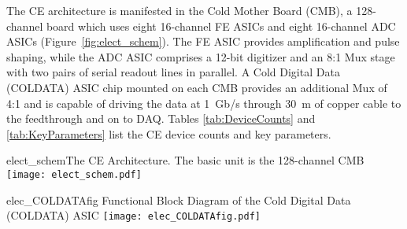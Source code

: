 The CE architecture is manifested in the Cold Mother Board (CMB),
a 128-channel board which uses eight 16-channel FE ASICs and eight 16-channel ADC ASICs
(Figure~\ref{fig:elect_schem}).
The FE ASIC provides amplification and pulse shaping, while
the ADC ASIC comprises a 12-bit digitizer
and an 8:1 Mux stage with two pairs of serial readout lines in parallel.
A Cold Digital Data (COLDATA) ASIC chip mounted on each CMB provides an additional Mux of 4:1 and
is capable of driving the data at 1~Gb/s through 30~m of copper cable to the feedthrough and on to DAQ. 
Tables \ref{tab:DeviceCounts} and \ref{tab:KeyParameters} list the CE device counts and key parameters.
\begin{cdrfigure}{elect_schem}{The CE Architecture. The basic unit is the 128-channel CMB}
\texttt{[image: elect\_schem.pdf]}
\end{cdrfigure}
\begin{cdrfigure}{elec_COLDATAfig}
{Functional Block Diagram of the Cold Digital Data (COLDATA) ASIC}
\texttt{[image: elec\_COLDATAfig.pdf]}
\end{cdrfigure}

